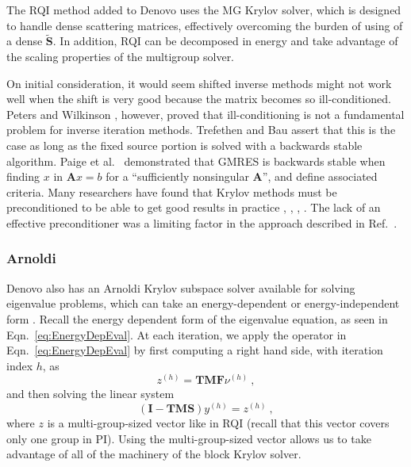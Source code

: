 \documentclass{article}                                                                           %
\newcommand{\ve}[1]{\ensuremath{\mathbf{#1}}}
\begin{document}
The RQI method added to Denovo uses the MG Krylov solver, which is designed to handle dense scattering matrices, effectively overcoming the burden of using of a dense $\ve{\tilde{S}}$. In addition, RQI can be decomposed in energy and take advantage of the scaling properties of the multigroup solver.


On initial consideration, it would seem shifted inverse methods might not work well when the shift is very good because the matrix becomes so ill-conditioned. Peters and Wilkinson \cite{Peters1979}, however, proved that ill-conditioning is not a fundamental problem for inverse iteration methods. Trefethen and Bau \cite{Trefethen1997} assert that this is the case as long as the fixed source portion is solved with a backwards stable algorithm. 
Paige et al.\ \cite{Paige2006} demonstrated that GMRES is backwards stable when finding $x$ in $\ve{A}x = b$ for a ``sufficiently nonsingular $\ve{A}$'', and define associated criteria. Many researchers have found that Krylov methods must be preconditioned to be able to get good results in practice \cite{Benzi2002}, \cite{Saad1986}, \cite{Trefethen1997} , \cite{Paige2006}. The lack of an effective preconditioner was a limiting factor in the approach described in Ref.~\cite{Slaybaugh2012}.

\subsubsection{Arnoldi}
Denovo also has an Arnoldi Krylov subspace solver available for solving eigenvalue problems, which can take an energy-dependent or energy-independent form \cite{Davidson2013}. Recall the energy dependent form of the eigenvalue equation, as seen in Eqn.~\eqref{eq:EnergyDepEval}. 
%
At each iteration, we apply the operator in Eqn.~\eqref{eq:EnergyDepEval} by first
computing a right hand side, with iteration index $h$, as
\begin{equation}
z^{(h)} = \mathbf{TMF}\nu^{(h)}\:,
\end{equation}
and then solving the linear system
\begin{equation}
(\mathbf{I}- \mathbf{TMS})y^{(h)} = z^{(h)}\:,
\end{equation}
where $z$ is a multi-group-sized vector like in RQI (recall that this vector
covers only one group in PI). Using the multi-group-sized vector allows us to
take advantage of all of the machinery of the block Krylov solver.
 
\end{document}
